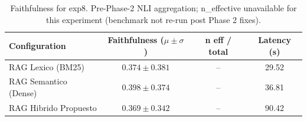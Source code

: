 \begin{table}[htbp]
\centering
\caption{Faithfulness for exp8. Pre-Phase-2 NLI aggregation; n\_effective unavailable for this experiment (benchmark not re-run post Phase 2 fixes).}
\label{tab:exp8-faithfulness-phase3}
\begin{tabular}{lccc}
\toprule
Configuration & Faithfulness ($\mu \pm \sigma$) & n eff / total & Latency (s) \\
\midrule
RAG Lexico (BM25) & $0.374 \pm 0.381$ & -- & 29.52 \\
RAG Semantico (Dense) & $0.398 \pm 0.374$ & -- & 36.81 \\
RAG Hibrido Propuesto & $0.369 \pm 0.342$ & -- & 90.42 \\
\bottomrule
\end{tabular}
\end{table}
